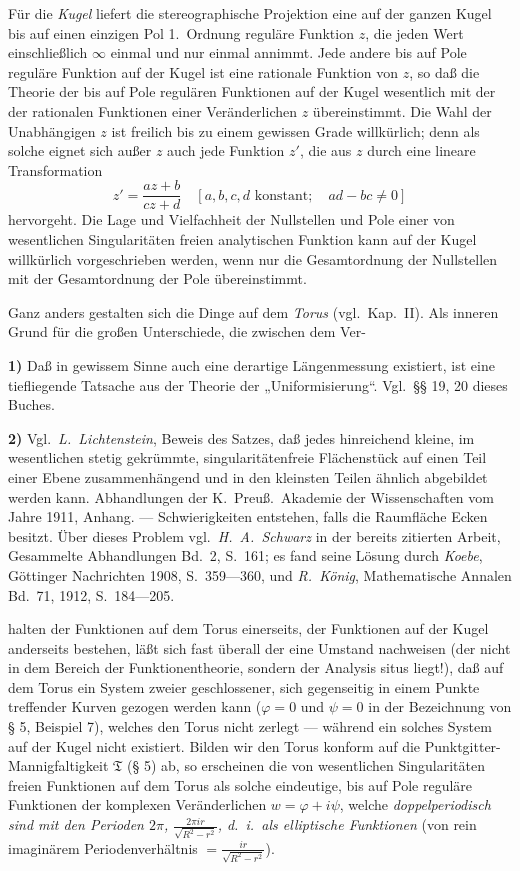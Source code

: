 \documentclass{article}
\begin{document}
Für die \emph{Kugel} liefert die stereographische Projektion eine auf der ganzen Kugel bis auf einen einzigen Pol 1.~Ordnung reguläre Funktion $z$, die jeden Wert einschließlich $\infty$ einmal und nur einmal annimmt. Jede andere bis auf Pole reguläre Funktion auf der Kugel ist eine rationale Funktion von $z$, so daß die Theorie der bis auf Pole regulären Funktionen auf der Kugel wesentlich mit der der rationalen Funktionen einer Veränderlichen $z$ übereinstimmt. Die Wahl der Unabhängigen $z$ ist freilich bis zu einem gewissen Grade willkürlich; denn als solche eignet sich außer $z$ auch jede Funktion $z'$, die aus $z$ durch eine lineare Transformation
\[ z' = \frac{az + b}{cz + d} \quad [a, b, c, d \text{ konstant}; \quad ad - bc \neq 0] \]
hervorgeht. Die Lage und Vielfachheit der Nullstellen und Pole einer von wesentlichen Singularitäten freien analytischen Funktion kann auf der Kugel willkürlich vorgeschrieben werden, wenn nur die Gesamtordnung der Nullstellen mit der Gesamtordnung der Pole übereinstimmt.

Ganz anders gestalten sich die Dinge auf dem \emph{Torus} (vgl.\ Kap.\ II). Als inneren Grund für die großen Unterschiede, die zwischen dem Ver-

\textbf{1)} Daß in gewissem Sinne auch eine derartige Längenmessung existiert, ist eine tiefliegende Tatsache aus der Theorie der „Uniformisierung“. Vgl.\ §§ 19, 20 dieses Buches.

\textbf{2)} Vgl.\ \emph{L.~Lichtenstein}, Beweis des Satzes, daß jedes hinreichend kleine, im wesentlichen stetig gekrümmte, singularitätenfreie Flächenstück auf einen Teil einer Ebene zusammenhängend und in den kleinsten Teilen ähnlich abgebildet werden kann. Abhandlungen der K.~Preuß.\ Akademie der Wissenschaften vom Jahre 1911, Anhang. --- Schwierigkeiten entstehen, falls die Raumfläche Ecken besitzt. Über dieses Problem vgl.\ \emph{H.~A.~Schwarz} in der bereits zitierten Arbeit, Gesammelte Abhandlungen Bd.\ 2, S.\ 161; es fand seine Lösung durch \emph{Koebe}, Göttinger Nachrichten 1908, S.\ 359---360, und \emph{R.~König}, Mathematische Annalen Bd.\ 71, 1912, S.\ 184---205.

halten der Funktionen auf dem Torus einerseits, der Funktionen auf der Kugel anderseits bestehen, läßt sich fast überall der eine Umstand nachweisen (der nicht in dem Bereich der Funktionentheorie, sondern der Analysis situs liegt!), daß auf dem Torus ein System zweier geschlossener, sich gegenseitig in einem Punkte treffender Kurven gezogen werden kann ($\varphi = 0$ und $\psi = 0$ in der Bezeichnung von § 5, Beispiel 7), welches den Torus nicht zerlegt --- während ein solches System auf der Kugel nicht existiert. Bilden wir den Torus konform auf die Punktgitter-Mannigfaltigkeit $\mathfrak{T}$ (§ 5) ab, so erscheinen die von wesentlichen Singularitäten freien Funktionen auf dem Torus als solche eindeutige, bis auf Pole reguläre Funktionen der komplexen Veränderlichen $w = \varphi + i\psi$, welche \emph{doppelperiodisch sind mit den Perioden $2\pi$, $\frac{2\pi ir}{\sqrt{R^2 - r^2}}$, d.\ i.\ als elliptische Funktionen} (von rein imaginärem Periodenverhältnis $= \frac{ir}{\sqrt{R^2 - r^2}}$).
\end{document}
